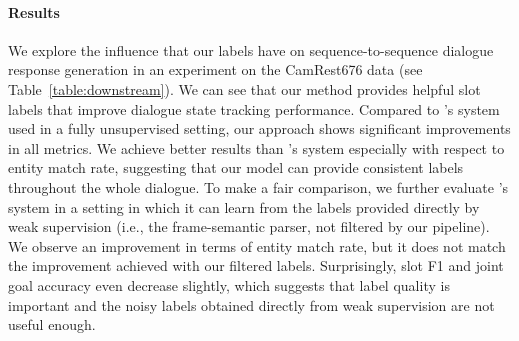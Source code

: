 \paragraph{Results} We explore the influence that our labels have on sequence-to-sequence dialogue response generation in an experiment on the CamRest676 data (see Table~\ref{table:downstream}).
We can see that our method provides helpful slot labels that improve dialogue state tracking performance.
Compared to \citet{jin2018explicit}'s system used in a fully unsupervised setting, our approach shows significant improvements in all metrics.
We achieve better results than \citet{jin2018explicit}'s system especially with respect to entity match rate, suggesting that our model can provide consistent labels throughout the whole dialogue.
To make a fair comparison, we further evaluate \citet{jin2018explicit}'s system in a setting in which it can learn from the labels provided directly by weak supervision (i.e., the frame-semantic parser, not filtered by our pipeline).
We observe an improvement in terms of entity match rate, but it does not match the improvement achieved with our filtered labels. Surprisingly, slot F1 and joint goal accuracy even decrease slightly, 
which suggests that label quality is important and the noisy labels obtained directly from weak supervision are not useful enough.

